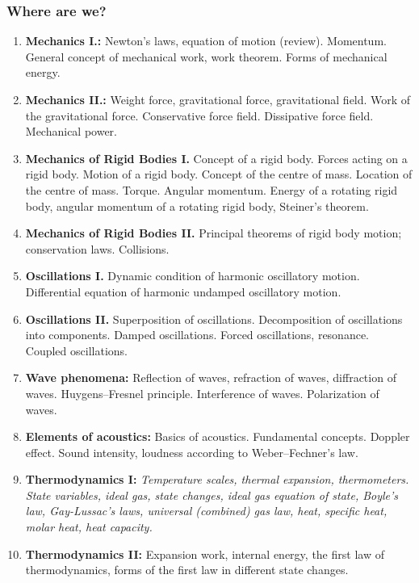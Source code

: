 \documentclass[t,aspectratio=169]{beamer}
\begin{document}

\begin{frame}
\frametitle{Where are we?}
\begin{enumerate}
\setlength{\parskip}{0pt}
\setlength{\itemsep}{0pt}
\item \textbf{Mechanics I.:} Newton’s laws, equation of motion (review). Momentum. General concept of mechanical work, work theorem. Forms of mechanical energy.
\item \textbf{Mechanics II.:} Weight force, gravitational force, gravitational field. Work of the gravitational force. Conservative force field. Dissipative force field. Mechanical power.
\item \textbf{Mechanics of Rigid Bodies I.} Concept of a rigid body. Forces acting on a rigid body. Motion of a rigid body. Concept of the centre of mass. Location of the centre of mass. Torque. Angular momentum. Energy of a rotating rigid body, angular momentum of a rotating rigid body, Steiner’s theorem.
\item \textbf{Mechanics of Rigid Bodies II.} Principal theorems of rigid body motion; conservation laws. Collisions.
\item \textbf{Oscillations I.} Dynamic condition of harmonic oscillatory motion. Differential equation of harmonic undamped oscillatory motion.
\pagebreak
\item \textbf{Oscillations II.} Superposition of oscillations. Decomposition of oscillations into components. Damped oscillations. Forced oscillations, resonance. Coupled oscillations.
\item \textbf{Wave phenomena:} Reflection of waves, refraction of waves, diffraction of waves. Huygens–Fresnel principle. Interference of waves. Polarization of waves.
\item \textbf{Elements of acoustics:} Basics of acoustics. Fundamental concepts. Doppler effect. Sound intensity, loudness according to Weber–Fechner’s law.
\item \textbf{Thermodynamics I:} \textit{Temperature scales, thermal expansion, thermometers. State variables, ideal gas, state changes, ideal gas equation of state, Boyle’s law, Gay-Lussac’s laws, universal (combined) gas law, heat, specific heat, molar heat, heat capacity.}
\item \textbf{Thermodynamics II:} Expansion work, internal energy, the first law of thermodynamics, forms of the first law in different state changes.

\end{enumerate}
\end{frame}
\end{document}

